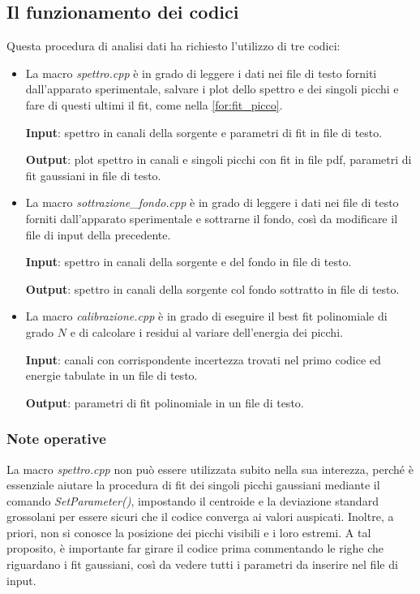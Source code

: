 \documentclass{article}
\begin{document}
        \subsection*{Il funzionamento dei codici}
            Questa procedura di analisi dati ha richiesto l'utilizzo di tre codici:
            \begin{itemize}
                \item La macro \textit{spettro.cpp} è in grado di leggere i dati nei file di testo forniti dall'apparato sperimentale, salvare i plot dello spettro e dei singoli picchi e fare di questi ultimi il fit, come nella \eqref{for:fit_picco}.
                
                \textbf{Input}: spettro in canali della sorgente e parametri di fit in file di testo.
                
                \textbf{Output}: plot spettro in canali e singoli picchi con fit in file pdf, parametri di fit gaussiani in file di testo.
                
                \item La macro \textit{sottrazione\_fondo.cpp} è in grado di leggere i dati nei file di testo forniti dall'apparato sperimentale e sottrarne il fondo, così da modificare il file di input della precedente.
                
                \textbf{Input}: spettro in canali della sorgente e del fondo in file di testo.
                
                \textbf{Output}: spettro in canali della sorgente col fondo sottratto in file di testo.
                
                \item La macro \textit{calibrazione.cpp} è in grado di eseguire il best fit polinomiale di grado $N$ e di calcolare i residui al variare dell'energia dei picchi.
                
                \textbf{Input}: canali con corrispondente incertezza trovati nel primo codice ed energie tabulate in un file di testo.
                
                \textbf{Output}: parametri di fit polinomiale in un file di testo.
            \end{itemize}
            
            \subsubsection*{Note operative}
                La macro \textit{spettro.cpp} non può essere utilizzata subito nella sua interezza, perché è essenziale aiutare la procedura di fit dei singoli picchi gaussiani mediante il comando \textit{SetParameter()}, impostando il centroide e la deviazione standard grossolani per essere sicuri che il codice converga ai valori auspicati. Inoltre, a priori, non si conosce la posizione dei picchi visibili e i loro estremi. A tal proposito, è importante far girare il codice prima commentando le righe che riguardano i fit gaussiani, così da vedere tutti i parametri da inserire nel file di input.
\end{document}
